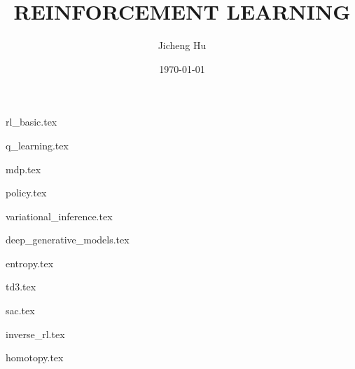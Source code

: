 \documentclass{book}
\title{REINFORCEMENT LEARNING}
\author{Jicheng Hu}
\date{\today}
\begin{document}
\frontmatter	%


\tableofcontents

\thispagestyle{empty}
\mainmatter		%

\begin{spacing}{1.0}    %

\setcounter{page}{1}


\def\allfiles{}

\ifx\allfiles\undefined
\else
{rl_basic.tex}
\fi

\ifx\allfiles\undefined
\else
{q_learning.tex}
\fi

\ifx\allfiles\undefined
\else
{mdp.tex}
\fi

\ifx\allfiles\undefined
\else
{policy.tex}
\fi

\ifx\allfiles\undefined
\else
{variational_inference.tex}
\fi

\ifx\allfiles\undefined
\else
{deep_generative_models.tex}
\fi

\ifx\allfiles\undefined
\else
{entropy.tex}
\fi

\ifx\allfiles\undefined
\else
{td3.tex}
\fi

\ifx\allfiles\undefined
\else
{sac.tex}
\fi

\ifx\allfiles\undefined
\else
{inverse_rl.tex}
\fi

\ifx\allfiles\undefined
\else
{homotopy.tex}
\fi


\end{spacing}
\end{document}
